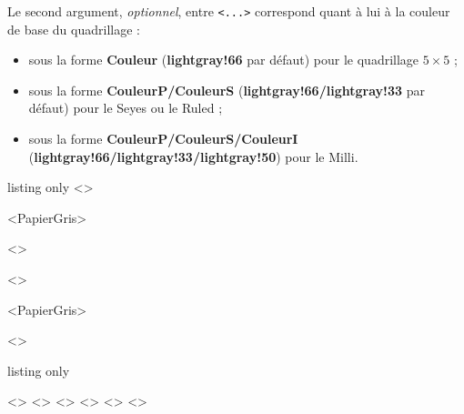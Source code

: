 \documentclass[a4paper]{article}
\newcommand\Cle[1]{{\bfseries\sffamily\textlangle #1\textrangle}}
\begin{document}
Le second argument, \textit{optionnel}, entre \texttt{<...>} correspond quant à lui à la couleur de base du quadrillage :

\begin{itemize}
	\item sous la forme \Cle{Couleur} (\Cle{lightgray!66} par défaut) pour le quadrillage $5\times5$ ;
	\item sous la forme \Cle{CouleurP/CouleurS} (\Cle{lightgray!66/lightgray!33} par défaut) pour le Seyes ou le Ruled ;
	\item sous la forme \Cle{CouleurP/CouleurS/CouleurI} (\Cle{lightgray!66/lightgray!33/lightgray!50}) pour le Milli.
\end{itemize}

\medskip

\begin{PresentationCode}{listing only}
\AffQuadrillage[NbCarreaux=16x4,Grille=Seyes,ReglureSeyes=2.5,AffBarre=false]<\CoulSeyes>

\AffQuadrillage[NbCarreaux=36x6,Elargir=3/3]<PapierGris>

\begin{center}
	\AffQuadrillage[NbCarreaux=12x3,Elargir=2/2,Grille=Ruled,Marge=2]<\CoulRuled>
\end{center}
\end{PresentationCode}

\medskip

\AffQuadrillage[NbCarreaux=18x4,Grille=Seyes,ReglureSeyes=2.5,AffBarre=false]<\CoulSeyes>

\medskip

\AffQuadrillage[NbCarreaux=36x8,Elargir=3/3]<PapierGris>

\begin{center}
	\AffQuadrillage[NbCarreaux=12x3,Elargir=2/2,Grille=Ruled,Marge=2]<\CoulRuled>
\end{center}

\begin{PresentationCode}{listing only}

\AffQuadrillage[Grille=Milli,NbCarreaux=9x2]<\CoulMilli>
\AffQuadrillage[Grille=Milli,NbCarreaux=9x2]<\CoulMilliGris>
\AffQuadrillage[Grille=Milli,NbCarreaux=9x2]<\CoulMilliBleu>
\AffQuadrillage[Grille=Milli,NbCarreaux=9x2]<\CoulMilliVert>
\AffQuadrillage[Grille=Milli,NbCarreaux=9x2]<\CoulMilliChaud>
\AffQuadrillage[Grille=Milli,NbCarreaux=9x2]<\CoulMilliContraste>
\end{PresentationCode}
\end{document}

